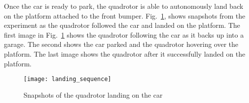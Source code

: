 Once the car is ready to park, the quadrotor is able to autonomously land back
on the platform attached to the front bumper. Fig.~\ref{fig:landing}, shows
snapshots from the experiment as the quadrotor followed the car and landed on
the platform. The first image in Fig.~\ref{fig:landing} shows the quadrotor
following the car as it backs up into a garage. The second shows the car parked
and the quadrotor hovering over the platform. The last image shows the
quadrotor after it successfully landed on the platform.

\begin{figure}[h!]

    \centering

    \centerline{\texttt{[image: landing\_sequence]}}

    \caption{Snapshots of the quadrotor landing on the car}

    \label{fig:landing}

\end{figure}

